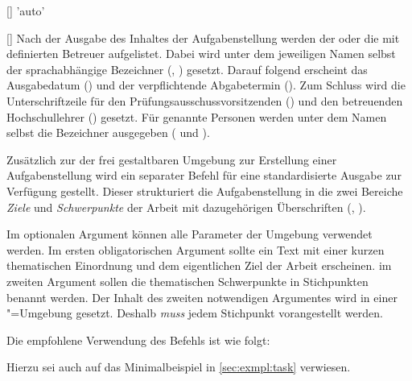 \begin{Declaration*}{}
\begin{Declaration}{[]}{%
  'auto'%
}
\begin{Declaration}{[]}
Nach der Ausgabe des Inhaltes der Aufgabenstellung werden der oder die mit 
 definierten Betreuer aufgelistet. Dabei wird unter dem 
jeweiligen Namen selbst der sprachabhängige Bezeichner (, 
) gesetzt. Darauf folgend erscheint das Ausgabedatum 
() und der verpflichtende Abgabetermin (). Zum 
Schluss wird die Unterschriftzeile für den Prüfungsausschussvorsitzenden 
() und den betreuenden Hochschullehrer () 
gesetzt. Für genannte Personen werden unter dem Namen selbst die Bezeichner 
ausgegeben ( und ).
\end{Declaration}
\end{Declaration}

\begin{Declaration}{\LParameter%
}
\printdeclarationlist%
%
Zusätzlich zur der frei gestaltbaren Umgebung  zur Erstellung
einer Aufgabenstellung wird ein separater Befehl für eine standardisierte 
Ausgabe zur Verfügung gestellt. Dieser strukturiert die Aufgabenstellung in die 
zwei Bereiche \emph{Ziele} und \emph{Schwerpunkte} der Arbeit mit dazugehörigen 
Überschriften (, ).

Im optionalen Argument können alle Parameter der Umgebung  
verwendet werden. Im ersten obligatorischen Argument sollte ein Text mit einer 
kurzen thematischen Einordnung und dem eigentlichen Ziel der Arbeit erscheinen. 
im zweiten Argument sollen die thematischen Schwerpunkte in Stichpunkten 
benannt werden. Der Inhalt des zweiten notwendigen Argumentes wird in einer 
"=Umgebung gesetzt. Deshalb \emph{muss} jedem Stichpunkt 
 vorangestellt werden.
%
\end{Declaration}
%
\begin{Example}
Die empfohlene Verwendung des Befehls  ist wie folgt:
\begin{Code}[escapechar=§]
\end{Code}
Hierzu sei auch auf das Minimalbeispiel in \autoref{sec:exmpl:task} verwiesen.
\end{Example}


\end{Declaration*}
